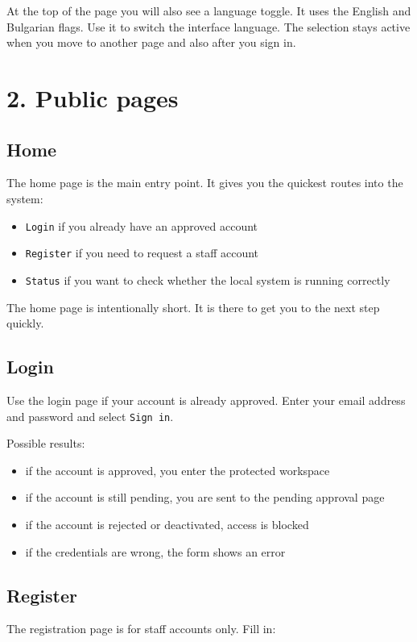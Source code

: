 \documentclass[11pt,a4paper]{article}
\begin{document}
At the top of the page you will also see a language toggle. It uses the English and Bulgarian flags. Use it to switch the interface language. The selection stays active when you move to another page and also after you sign in.

\section*{2. Public pages}
\subsection*{Home}
The home page is the main entry point. It gives you the quickest routes into the system:

\begin{itemize}
  \item \texttt{Login} if you already have an approved account
  \item \texttt{Register} if you need to request a staff account
  \item \texttt{Status} if you want to check whether the local system is running correctly
\end{itemize}

The home page is intentionally short. It is there to get you to the next step quickly.

\subsection*{Login}
Use the login page if your account is already approved. Enter your email address and password and select \texttt{Sign in}.

Possible results:

\begin{itemize}
  \item if the account is approved, you enter the protected workspace
  \item if the account is still pending, you are sent to the pending approval page
  \item if the account is rejected or deactivated, access is blocked
  \item if the credentials are wrong, the form shows an error
\end{itemize}

\subsection*{Register}
The registration page is for staff accounts only. Fill in:
\end{document}
